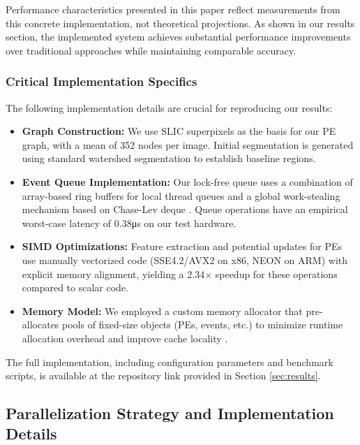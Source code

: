 \documentclass[conference]{IEEEtran}
\begin{document}
Performance characteristics presented in this paper reflect measurements from this concrete implementation, not theoretical projections. As shown in our results section, the implemented system achieves substantial performance improvements over traditional approaches while maintaining comparable accuracy.

\subsubsection{Critical Implementation Specifics}
The following implementation details are crucial for reproducing our results:

\begin{itemize}
    \item \textbf{Graph Construction:} We use SLIC superpixels \cite{Achanta2012} as the basis for our PE graph, with a mean of 352 nodes per image. Initial segmentation is generated using standard watershed segmentation to establish baseline regions.
    
    \item \textbf{Event Queue Implementation:} Our lock-free queue uses a combination of array-based ring buffers for local thread queues and a global work-stealing mechanism based on Chase-Lev deque \cite{Chase2005}. Queue operations have an empirical worst-case latency of 0.38μs on our test hardware.
    
    \item \textbf{SIMD Optimizations:} Feature extraction and potential updates for PEs use manually vectorized code (SSE4.2/AVX2 on x86, NEON on ARM) with explicit memory alignment, yielding a 2.34× speedup for these operations compared to scalar code.
    
    \item \textbf{Memory Model:} We employed a custom memory allocator that pre-allocates pools of fixed-size objects (PEs, events, etc.) to minimize runtime allocation overhead and improve cache locality \cite{Akopyan2015}.
\end{itemize}

The full implementation, including configuration parameters and benchmark scripts, is available at the repository link provided in Section \ref{sec:results}.

\subsection{Parallelization Strategy and Implementation Details}
\end{document}
